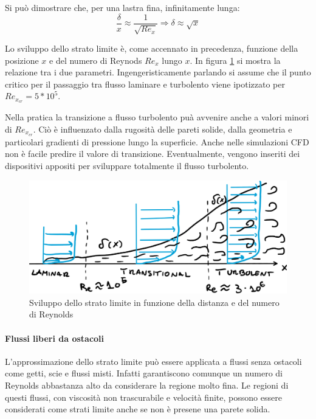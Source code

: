 Si può dimostrare che, per una lastra fina, infinitamente lunga:
\begin{equation}
\frac{\delta}{x} \approx \frac{1}{\sqrt{Re_x}} \Rightarrow \delta \approx \sqrt{x}
\end{equation}

Lo sviluppo dello strato limite è, come accennato in precedenza, funzione della posizione $x$ e del numero di Reynods $Re_x$ lungo $x$.
In figura \ref{fig:BoundaryLayer} si mostra la relazione tra i due parametri.
Ingengeristicamente parlando si assume che il punto critico per il passaggio tra flusso laminare e turbolento viene ipotizzato per $Re_{x_{cr}} = 5*10^5$.

Nella pratica la transizione a flusso turbolento puà avvenire anche a valori minori di $Re_{x_{cr}}$. Ciò è influenzato dalla rugosità delle pareti solide, dalla geometria e particolari gradienti di pressione lungo la superficie.
Anche nelle simulazioni \ac{CFD} non è facile predire il valore di transizione.
Eventualmente, vengono inseriti dei dispositivi appositi per sviluppare totalmente il flusso turbolento.

\begin{figure}
\centering
\includegraphics[width = \textwidth]{gfx/BoundaryLayer}
\caption{Sviluppo dello strato limite in funzione della distanza e del numero di Reynolds}
\label{fig:BoundaryLayer}
\end{figure}

\paragraph{Flussi liberi da ostacoli} L'approssimazione dello strato limite può essere applicata a flussi senza ostacoli come getti, scie e flussi misti.
Infatti garantiscono comunque un numero di Reynolds abbastanza alto da considerare la regione molto fina.
Le regioni di questi flussi, con viscosità non trascurabile e velocità finite, possono essere considerati come strati limite anche se non è presene una parete solida.

